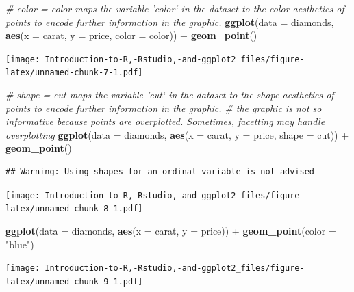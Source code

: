 \documentclass[]{book}
\newenvironment{Shaded}{\begin{snugshade}}{\end{snugshade}}
\newcommand{\KeywordTok}[1]{\textcolor[rgb]{0.13,0.29,0.53}{\textbf{{#1}}}}
\newcommand{\DataTypeTok}[1]{\textcolor[rgb]{0.13,0.29,0.53}{{#1}}}
\newcommand{\StringTok}[1]{\textcolor[rgb]{0.31,0.60,0.02}{{#1}}}
\newcommand{\CommentTok}[1]{\textcolor[rgb]{0.56,0.35,0.01}{\textit{{#1}}}}
\newcommand{\NormalTok}[1]{{#1}}
\begin{document}
\begin{Shaded}
\begin{Highlighting}[]
\CommentTok{# color = color maps the variable 'color` in the dataset to the color aesthetics of points to encode further information in the graphic. }
\KeywordTok{ggplot}\NormalTok{(}\DataTypeTok{data =} \NormalTok{diamonds, }\KeywordTok{aes}\NormalTok{(}\DataTypeTok{x =} \NormalTok{carat, }\DataTypeTok{y =} \NormalTok{price, }\DataTypeTok{color =} \NormalTok{color)) +}\StringTok{ }\KeywordTok{geom_point}\NormalTok{()}
\end{Highlighting}
\end{Shaded}

\texttt{[image: Introduction-to-R,-Rstudio,-and-ggplot2\_files/figure-latex/unnamed-chunk-7-1.pdf]}

\begin{Shaded}
\begin{Highlighting}[]
\CommentTok{# shape = cut maps the variable 'cut` in the dataset to the shape aesthetics of points to encode further information in the graphic. }
\CommentTok{# the graphic is not so informative because points are overplotted. Sometimes, facetting may handle overplotting }
\KeywordTok{ggplot}\NormalTok{(}\DataTypeTok{data =} \NormalTok{diamonds, }\KeywordTok{aes}\NormalTok{(}\DataTypeTok{x =} \NormalTok{carat, }\DataTypeTok{y =} \NormalTok{price, }\DataTypeTok{shape =} \NormalTok{cut)) +}\StringTok{ }\KeywordTok{geom_point}\NormalTok{()}
\end{Highlighting}
\end{Shaded}

\begin{verbatim}
## Warning: Using shapes for an ordinal variable is not advised
\end{verbatim}

\texttt{[image: Introduction-to-R,-Rstudio,-and-ggplot2\_files/figure-latex/unnamed-chunk-8-1.pdf]}

\begin{Shaded}
\begin{Highlighting}[]
\KeywordTok{ggplot}\NormalTok{(}\DataTypeTok{data =} \NormalTok{diamonds, }\KeywordTok{aes}\NormalTok{(}\DataTypeTok{x =} \NormalTok{carat, }\DataTypeTok{y =} \NormalTok{price)) +}\StringTok{ }\KeywordTok{geom_point}\NormalTok{(}\DataTypeTok{color =} \StringTok{"blue"}\NormalTok{)}
\end{Highlighting}
\end{Shaded}

\texttt{[image: Introduction-to-R,-Rstudio,-and-ggplot2\_files/figure-latex/unnamed-chunk-9-1.pdf]}
\end{document}
